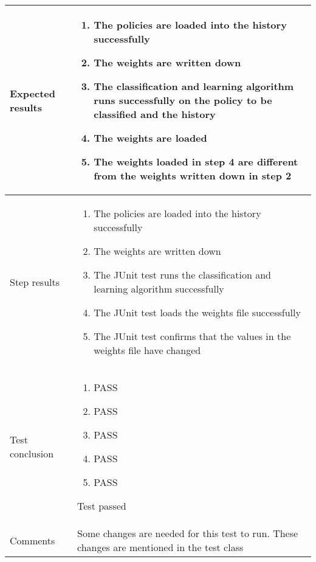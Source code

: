 \begin{center}
\begin{longtable}{ | p{4cm} | p{10cm} | }
			Expected results &	\begin{enumerate}
							\item The policies are loaded into the history successfully
							\item The weights are written down
							\item The classification and learning algorithm runs successfully on the policy to be classified and the history
							\item The weights are loaded
							\item The weights loaded in step 4 are different from the weights written down in step 2
						\end{enumerate}
							 \\  [3pt] \hline

			Step results & 	\begin{enumerate}
							\item The policies are loaded into the history successfully
							\item The weights are written down
							\item The JUnit test runs the classification and learning algorithm successfully
							\item The JUnit test loads the weights file successfully
							\item The JUnit test confirms that the values in the weights file have changed
						\end{enumerate}
							 \\  [3pt] \hline

			Test conclusion & 	\begin{enumerate}
							\item PASS
							\item PASS
							\item PASS
							\item PASS
							\item PASS
						\end{enumerate}
						Test passed \\ [3pt] \hline
			Comments & Some changes are needed for this test to run. These changes are mentioned in the test class
				\\ [3pt] \hline
		\end{longtable}
	\end{center}


